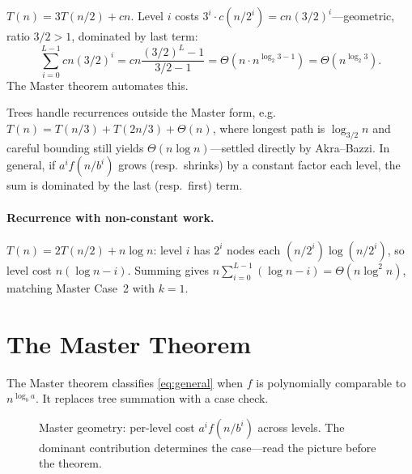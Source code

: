 \begin{example}
$T(n)=3T(n/2)+cn$. Level $i$ costs $3^{i}\cdot c(n/2^{i})=cn(3/2)^{i}$---geometric, ratio $3/2>1$, dominated by last term:
\[\sum_{i=0}^{L-1}cn(3/2)^{i}=cn\frac{(3/2)^{L}-1}{3/2-1}=\Theta(n\cdot n^{\log_{2}3-1})=\Theta(n^{\log_{2}3}).\]
The Master theorem automates this.
\end{example}

\begin{remark}
Trees handle recurrences outside the Master form, e.g.\ $T(n)=T(n/3)+T(2n/3)+\Theta(n)$, where longest path is $\log_{3/2}n$ and careful bounding still yields $\Theta(n\log n)$---settled directly by Akra--Bazzi. In general, if $a^{i}f(n/b^{i})$ grows (resp.\ shrinks) by a constant factor each level, the sum is dominated by the last (resp.\ first) term.
\end{remark}
\paragraph{Recurrence with non-constant work.} $T(n)=2T(n/2)+n\log n$: level $i$ has $2^{i}$ nodes each $(n/2^{i})\log(n/2^{i})$, so level cost $n(\log n-i)$. Summing gives $n\sum_{i=0}^{L-1}(\log n-i)=\Theta(n\log^{2}n)$, matching Master Case~2 with $k=1$.

\section{The Master Theorem}\label{sec:master}

The Master theorem classifies \eqref{eq:general} when $f$ is polynomially comparable to $n^{\log_{b}a}$. It replaces tree summation with a case check.

\begin{figure}[htbp]
\centering
{}
\caption{Master geometry: per-level cost $a^{i}f(n/b^{i})$ across levels. The dominant contribution determines the case---read the picture before the theorem.}
\label{fig:mastergeom}
\end{figure}

